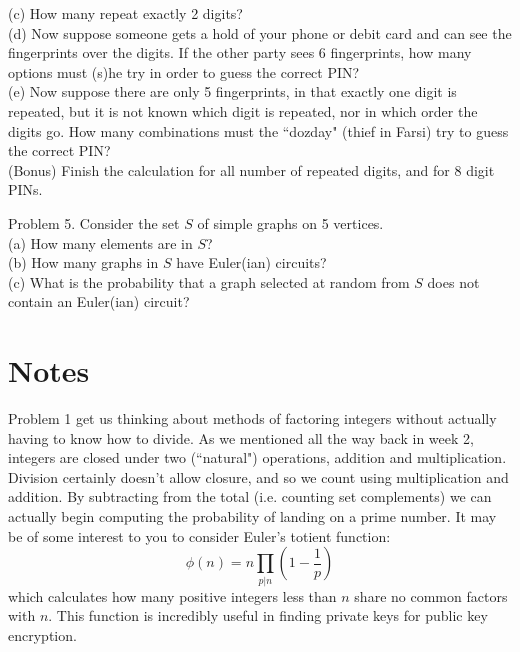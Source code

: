 \documentclass[16 pt]{amsart}
\theoremstyle{definition}
\theoremstyle{remark}
\numberwithin{equation}{subsection}
\begin{document}
(c) How many repeat exactly 2 digits?\\

(d) Now suppose someone gets a hold of your phone or debit card and can see the fingerprints over the digits.  If the other party sees 6 fingerprints, how many options must (s)he try in order to guess the correct PIN?\\

(e) Now suppose there are only 5 fingerprints, in that exactly one digit is repeated, but it is not known which digit is repeated, nor in which order the digits go.  How many combinations must the ``dozday" (thief in Farsi) try to guess the correct PIN?\\

(Bonus) Finish the calculation for all number of repeated digits, and for 8 digit PINs.

\newpage 

Problem 5. Consider the set $S$ of simple graphs on 5 vertices.\\

(a) How many elements are in $S$?\\

(b) How many graphs in $S$ have Euler(ian) circuits?\\

(c) What is the probability that a graph selected at random from $S$ does not contain an Euler(ian) circuit?



\newpage

\section{Notes}

Problem 1 get us thinking about methods of factoring integers without actually having to know how to divide.  As we mentioned all the way back in week 2, integers are closed under two (``natural") operations, addition and multiplication.  Division certainly doesn't allow closure, and so we count using multiplication and addition.  By subtracting from the total (i.e. counting set complements) we can actually begin computing the probability of landing on a prime number.  It may be of some interest to you to consider Euler's totient function:
\[
\phi(n) = n\prod_{p|n}\left(1 - \frac{1}{p}\right)
\]   
which calculates how many positive integers less than $n$ share no common factors with $n$.  This function is incredibly useful in finding private keys for public key encryption.  
\end{document}
